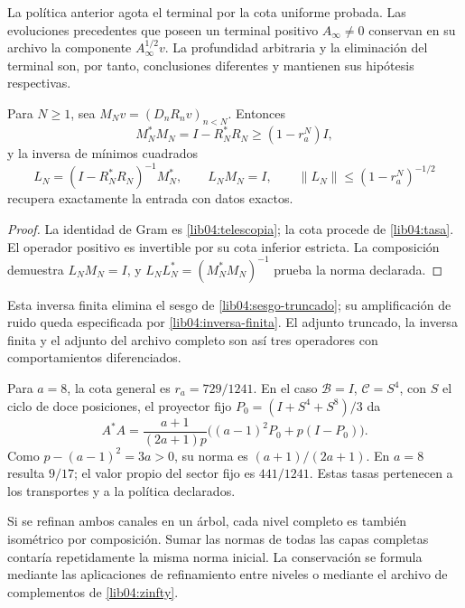 La política anterior agota el terminal por la cota uniforme probada.
Las evoluciones precedentes que poseen un terminal positivo
\(A_\infty\neq0\) conservan en su archivo la componente
\(A_\infty^{1/2}v\). La profundidad arbitraria y la eliminación del
terminal son, por tanto, conclusiones diferentes y mantienen sus
hipótesis respectivas.

\begin{proposition}
\label{lib04:prop-inversa-finita}
Para \(N\geq1\), sea \(M_Nv=(D_nR_nv)_{n<N}\). Entonces
\begin{equation}
 M_N^*M_N=I-R_N^*R_N\geq(1-r_a^N)I,
 \label{lib04:gram-finito}
\end{equation}
y la inversa de mínimos cuadrados
\begin{equation}
 L_N=(I-R_N^*R_N)^{-1}M_N^*,\qquad
 L_NM_N=I,\qquad
 \|L_N\|\leq(1-r_a^N)^{-1/2}
 \label{lib04:inversa-finita}
\end{equation}
recupera exactamente la entrada con datos exactos.
\end{proposition}

\begin{proof}
La identidad de Gram es \eqref{lib04:telescopia}; la cota procede de
\eqref{lib04:tasa}. El operador positivo es invertible por su cota
inferior estricta. La composición demuestra \(L_NM_N=I\), y
\(L_NL_N^*=(M_N^*M_N)^{-1}\) prueba la norma declarada.
\end{proof}

Esta inversa finita elimina el sesgo de
\eqref{lib04:sesgo-truncado}; su amplificación de ruido queda
especificada por \eqref{lib04:inversa-finita}. El adjunto truncado,
la inversa finita y el adjunto del archivo completo son así tres
operadores con comportamientos diferenciados.

Para \(a=8\), la cota general es \(r_a=729/1241\). En el caso
\(\mathcal B=I\), \(\mathcal C=S^4\), con \(S\) el ciclo de
doce posiciones, el proyector fijo
\(P_0=(I+S^4+S^8)/3\) da
\begin{equation}
 A^*A=\frac{a+1}{(2a+1)p}
       \bigl((a-1)^2P_0+p(I-P_0)\bigr).
 \label{lib04:gram-tasa-ternaria}
\end{equation}
Como \(p-(a-1)^2=3a>0\), su norma es
\((a+1)/(2a+1)\). En \(a=8\) resulta \(9/17\); el valor propio
del sector fijo es \(441/1241\). Estas tasas pertenecen a los
transportes y a la política declarados.

Si se refinan ambos canales en un árbol, cada nivel completo es también
isométrico por composición. Sumar las normas de todas las capas
completas contaría repetidamente la misma norma inicial. La conservación
se formula mediante las aplicaciones de refinamiento entre niveles o
mediante el archivo de complementos de \eqref{lib04:zinfty}.

